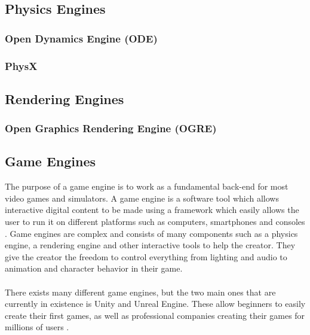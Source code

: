 \subsection{Physics Engines}

\subsubsection{Open Dynamics Engine (ODE)}
\subsubsection{PhysX}


\subsection{Rendering Engines}  %
\subsubsection{Open Graphics Rendering Engine (OGRE)}

\subsection{Game Engines}
The purpose of a game engine is to work as a fundamental back-end for most video games and simulators. A game engine is a software tool which allows interactive digital content to be made using a framework which easily allows the user to run it on different platforms such as computers, smartphones and consoles \cite{GameEngine_UnityGame_book}. Game engines are complex and consists of many components such as a physics engine, a rendering engine and other interactive tools to help the creator. They give the creator the freedom to control everything from lighting and audio to animation and character behavior in their game.
\\~\\
There exists many different game engines, but the two main ones that are currently in existence is Unity and Unreal Engine. These allow beginners to easily create their first games, as well as professional companies creating their games for millions of users \cite{GamesMadeInUnity, GamesMadeInUnrealEngine}.

